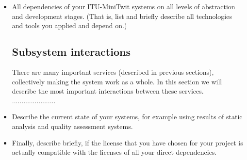 \begin{itemize}
  \item All dependencies of your ITU-MiniTwit systems on all levels of abstraction and development stages. (That is, list and briefly describe all technologies and tools you applied and depend on.)
  \subsection{Subsystem interactions}
  There are many important services (described in previous sections), collectively making the system work as a whole.
  In this section we will describe the most important interactions between these services.\newline
  .......................
  
  \item Describe the current state of your systems, for example using results of static analysis and quality assessment systems.
  \item Finally, describe briefly, if the license that you have chosen for your project is actually compatible with the licenses of all your direct dependencies.
  
\end{itemize}